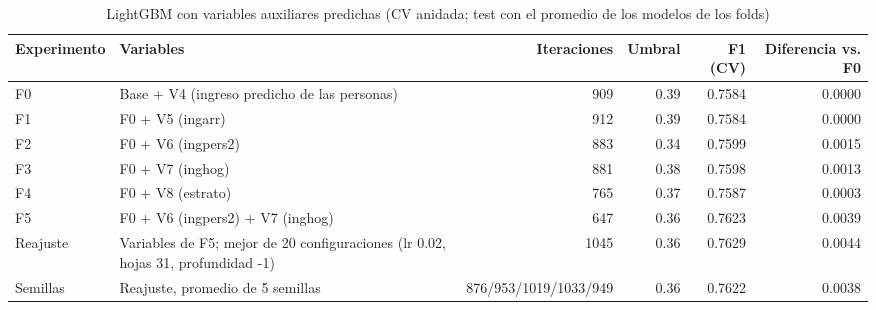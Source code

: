\begin{table}

\caption{\label{tab:boosting_ingreso}LightGBM con variables auxiliares predichas (CV anidada; test con el promedio de los modelos de los folds)}
\centering
\begin{tabular}[t]{lp{7cm}rrrr}
\toprule
Experimento & Variables & Iteraciones & Umbral & F1 (CV) & Diferencia vs. F0\\
\midrule
F0 & Base + V4 (ingreso predicho de las personas) & 909 & 0.39 & 0.7584 & 0.0000\\
F1 & F0 + V5 (ingarr) & 912 & 0.39 & 0.7584 & 0.0000\\
F2 & F0 + V6 (ingpers2) & 883 & 0.34 & 0.7599 & 0.0015\\
F3 & F0 + V7 (inghog) & 881 & 0.38 & 0.7598 & 0.0013\\
F4 & F0 + V8 (estrato) & 765 & 0.37 & 0.7587 & 0.0003\\
\addlinespace
F5 & F0 + V6 (ingpers2) + V7 (inghog) & 647 & 0.36 & 0.7623 & 0.0039\\
Reajuste & Variables de F5; mejor de 20 configuraciones (lr 0.02, hojas 31, profundidad -1) & 1045 & 0.36 & 0.7629 & 0.0044\\
Semillas & Reajuste, promedio de 5 semillas & 876/953/1019/1033/949 & 0.36 & 0.7622 & 0.0038\\
\bottomrule
\end{tabular}
\end{table}
